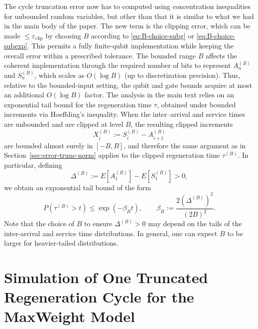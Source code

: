 \documentclass[11pt]{article}
\begin{document}
The cycle truncation error now has to computed using concentration inequalities for unbounded random variables, but other than that it is similar to what we had in the main body of the paper. The new term is the clipping error, which can be made $\le \varepsilon_{\mathrm{clip}}$
by choosing $B$ according to \eqref{eq:B-choice-subg} or \eqref{eq:B-choice-subexp}.
This permits a fully finite-qubit implementation while keeping the overall error
within a prescribed tolerance.
The bounded range $B$ affects the coherent implementation through the
required number of bits to represent $A_n^{(B)}$ and $S_n^{(B)}$, which scales as
$O(\log B)$ (up to discretization precision).
Thus, relative to the bounded-input
setting, the qubit and gate bounds acquire at most an additional $O(\log B)$ factor.
The analysis in the main text relies on an exponential tail bound for the regeneration time $\tau$,
obtained under bounded increments via Hoeffding’s inequality.
When the inter--arrival and service
times are unbounded and are clipped at level $B$, the resulting clipped increments
\[
X_i^{(B)} := S_i^{(B)} - A_{i+1}^{(B)}
\]
are bounded almost surely in $[-B,B]$, and therefore the same argument as in Section~\ref{sec:error-trunc-norm} applies
to the clipped regeneration time $\tau^{(B)}$.
In particular, defining
\[
\Delta^{(B)} := E[A_1^{(B)}] - E[S_1^{(B)}] > 0,
\]
we obtain an exponential tail bound of the form
\[
P(\tau^{(B)} > t) \le \exp\!\left(-\beta_B t\right),
\qquad
\beta_B := \frac{2(\Delta^{(B)})^2}{(2B)^2}.
\]
Note that the choice of $B$ to ensure $\Delta^{(B)}>0$ may depend on the tails of the inter-arrival and service time distributions.
In general, one can expect $B$ to be larger for heavier-tailed distributions.
\newpage
\section{Simulation of One Truncated Regeneration Cycle for the MaxWeight Model}\label{app:quantum wireless}

\end{document}
